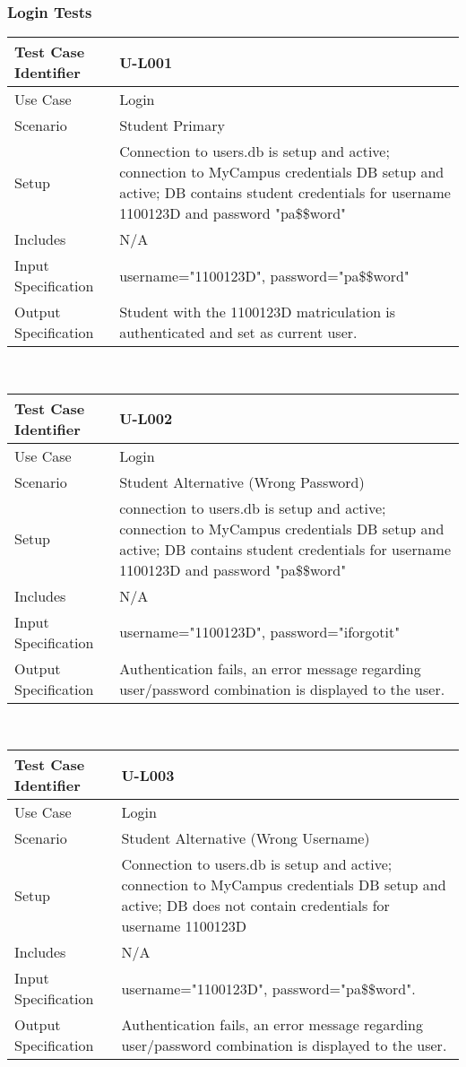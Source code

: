 \documentclass{l3deliverable}
\begin{document}
\subsubsection{Login Tests}
\begin{tabular}{lp{10cm}}
\hline 
\textbf{Test Case Identifier} & U-L001\tabularnewline
\hline 
\hline 
Use Case & Login \tabularnewline
\hline 
Scenario & Student Primary \tabularnewline
\hline 
Setup &  Connection to users.db is setup and active; connection to MyCampus credentials DB setup and active; DB contains student credentials for username 1100123D and password "pa\$\$word" \tabularnewline
\hline 
Includes &  N/A \tabularnewline
\hline 
Input Specification & username="1100123D", password="pa\$\$word"\tabularnewline
\hline 
Output Specification & Student with the 1100123D matriculation is authenticated and set as current user.\tabularnewline
\hline 
\end{tabular}\\


\begin{tabular}{lp{10cm}}
\hline 
\textbf{Test Case Identifier} & U-L002 \tabularnewline
\hline 
\hline 
Use Case & Login \tabularnewline
\hline 
Scenario & Student Alternative (Wrong Password) \tabularnewline
\hline 
Setup & connection to users.db is setup and active; connection to MyCampus credentials DB setup and active; DB contains student credentials for username 1100123D and password "pa\$\$word" \tabularnewline
\hline 
Includes & N/A \tabularnewline
\hline 
Input Specification & username="1100123D", password="iforgotit" \tabularnewline
\hline 
Output Specification & Authentication fails, an error message regarding user/password combination is displayed to the user.\tabularnewline
\hline 
\end{tabular}\\



\begin{tabular}{lp{10cm}}
\hline 
\textbf{Test Case Identifier} & U-L003\tabularnewline
\hline 
\hline 
Use Case & Login \tabularnewline
\hline 
Scenario & Student Alternative (Wrong Username) \tabularnewline
\hline 
Setup & Connection to users.db is setup and active; connection to MyCampus credentials DB setup and active; DB does not contain credentials for username 1100123D  \tabularnewline
\hline 
Includes & N/A \tabularnewline
\hline 
Input Specification & username="1100123D", password="pa\$\$word".\tabularnewline
\hline 
Output Specification & Authentication fails, an error message regarding user/password combination is displayed to the user.\tabularnewline
\hline 
\end{tabular}\\
\end{document}
